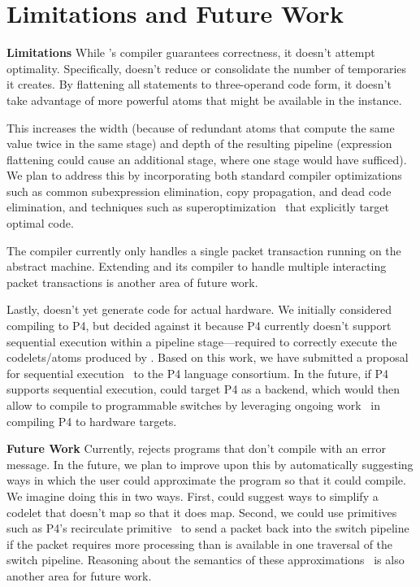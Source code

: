 \section{Limitations and Future Work}
\label{s:limitations}

\textbf{Limitations}
While \pktlanguage's compiler guarantees correctness, it doesn't attempt
optimality.  Specifically, \pktlanguage doesn't reduce or consolidate the
number of temporaries it creates. By flattening all statements to three-operand
code form, it doesn't take advantage of more powerful atoms that might be
available in the \absmachine instance.

This increases the width (because of redundant atoms that compute the same
value twice in the same stage) and depth of the resulting pipeline (expression
flattening could cause an additional stage, where one stage would have
sufficed). We plan to address this by incorporating both standard compiler
optimizations such as common subexpression elimination, copy propagation, and
dead code elimination, and techniques such as superoptimization~\cite{stoke,
superoptimizer} that explicitly target optimal code.

The \pktlanguage compiler currently only handles a single packet transaction
running on the abstract machine.  Extending \pktlanguage and its compiler to
handle multiple interacting packet transactions is another area of future work.

Lastly, \pktlanguage doesn't yet generate code for actual hardware. We
initially considered compiling \pktlanguage to P4, but decided against it
because P4 currently doesn't support sequential execution within a
pipeline stage---required to correctly execute the codelets/atoms produced by
\pktlanguage. Based on this work, we have submitted a proposal for sequential
execution~\cite{p4-semantics} to the P4 language consortium. In the future, if
P4 supports sequential execution, \pktlanguage could target P4 as a backend,
which would then allow \pktlanguage to compile to programmable switches by
leveraging ongoing work~\cite{netronome, xilinx,lavanya_compiler} in compiling
P4 to hardware targets.

\textbf{Future Work}
Currently, \pktlanguage rejects programs that don't compile with an error
message.  In the future, we plan to improve upon this by automatically
suggesting ways in which the user could approximate the program so that it
could compile. We imagine doing this in two ways. First, \pktlanguage could
suggest ways to simplify a codelet that doesn't map so that it does map.
Second, we could use primitives such as P4's recirculate
primitive~\cite{p4spec} to send a packet back into the switch pipeline if the
packet requires more processing than is available in one traversal of the
switch pipeline. Reasoning about the semantics of these
approximations~\cite{sampsonApprox, chisel} is also another area for future
work.

